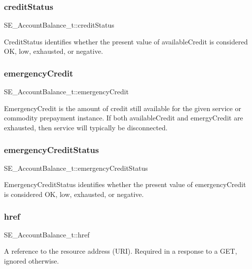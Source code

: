 \subsubsection{\texorpdfstring{credit\+Status}{creditStatus}}
{\footnotesize\ttfamily S\+E\+\_\+\+Account\+Balance\+\_\+t\+::credit\+Status}

Credit\+Status identifies whether the present value of available\+Credit is considered OK, low, exhausted, or negative. \mbox{\label{group__AccountBalance_gab10aee5ec25f421ce4a7d4e470d72744}} 
\subsubsection{\texorpdfstring{emergency\+Credit}{emergencyCredit}}
{\footnotesize\ttfamily S\+E\+\_\+\+Account\+Balance\+\_\+t\+::emergency\+Credit}

Emergency\+Credit is the amount of credit still available for the given service or commodity prepayment instance. If both available\+Credit and emergy\+Credit are exhausted, then service will typically be disconnected. \mbox{\label{group__AccountBalance_ga93e7a084d8d647dee96f8650febd4683}} 
\subsubsection{\texorpdfstring{emergency\+Credit\+Status}{emergencyCreditStatus}}
{\footnotesize\ttfamily S\+E\+\_\+\+Account\+Balance\+\_\+t\+::emergency\+Credit\+Status}

Emergency\+Credit\+Status identifies whether the present value of emergency\+Credit is considered OK, low, exhausted, or negative. \mbox{\label{group__AccountBalance_gadccc9402133c6ca77e618358c960068b}} 
\subsubsection{\texorpdfstring{href}{href}}
{\footnotesize\ttfamily S\+E\+\_\+\+Account\+Balance\+\_\+t\+::href}

A reference to the resource address (U\+RI). Required in a response to a G\+ET, ignored otherwise. 